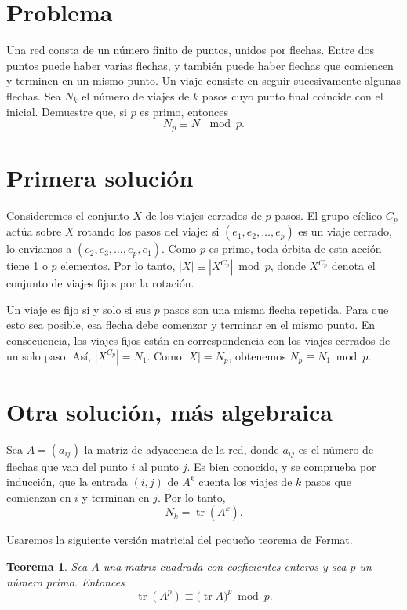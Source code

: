 \documentclass[11pt]{amsproc}
\newtheorem*{theorem}{Teorema}
\begin{document}
\section*{Problema}

Una red consta de un número finito de puntos, unidos por flechas. Entre dos
puntos puede haber varias flechas, y también puede haber flechas que comiencen
y terminen en un mismo punto.
Un viaje consiste en seguir sucesivamente algunas flechas. Sea $N_k$ el
número de viajes de $k$ pasos cuyo punto final coincide con el inicial.
Demuestre que, si $p$ es primo, entonces
\[
N_p\equiv N_1\bmod p.
\]

\section*{Primera solución}

Consideremos el conjunto $X$ de los viajes cerrados de $p$ pasos. El grupo
cíclico $C_p$ actúa sobre $X$ rotando los pasos del viaje: si
$(e_1,e_2,\dots,e_p)$ 
es un viaje cerrado, lo enviamos a
$(e_2,e_3,\dots,e_p,e_1)$.
Como $p$ es primo, toda órbita de esta acción tiene 1 o $p$ elementos.
Por lo tanto,
$|X|\equiv |X^{C_p}|\bmod p$, 
donde $X^{C_p}$ denota el conjunto de viajes fijos por la rotación.

Un viaje es fijo si y solo si sus $p$ pasos son una misma flecha repetida.
Para que esto sea posible, esa flecha debe comenzar y terminar en el mismo
punto. En consecuencia, los viajes fijos están en correspondencia con los
viajes cerrados de un solo paso. Así,
$|X^{C_p}|=N_1$. 
Como $|X|=N_p$, obtenemos
$N_p\equiv N_1\bmod p$.

\section*{Otra solución, más algebraica}

Sea $A=(a_{ij})$ la matriz de adyacencia de la red, donde $a_{ij}$ es el
número de flechas que van del punto $i$ al punto $j$. Es bien conocido, y
se comprueba por inducción, que la entrada $(i,j)$ de $A^k$ cuenta los
viajes de $k$ pasos que comienzan en $i$ y terminan en $j$. Por lo tanto,
\[
N_k=\operatorname{tr}(A^k).
\]

Usaremos la siguiente versión matricial del pequeño teorema de Fermat.

\begin{theorem}
Sea $A$ una matriz cuadrada con coeficientes enteros y sea $p$ un número
primo. Entonces
\[
\operatorname{tr}(A^p)\equiv
\bigl(\operatorname{tr}A\bigr)^p\bmod p.
\]
\end{theorem}
\end{document}
